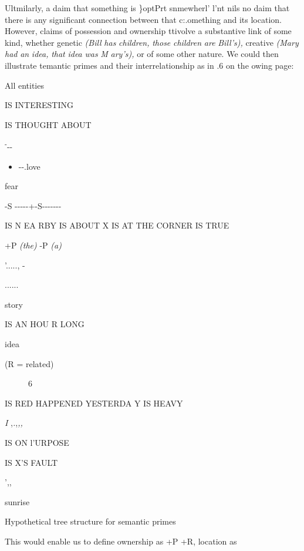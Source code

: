 Ultmilarly, a daim that something is \}optPrt snmewherl' l'nt nils no daim that there is any significant connection between that c:.ome\-thing and its location. However, claims of possession and ownership ttivolve a substantive link of some kind, whether genetic \textit{(Bill} \textit{has} \textit{children,} \textit{those} \textit{children} \textit{are} \textit{Bill's),} creative \textit{(Mary} \textit{had} \textit{an} \textit{idea,} \textit{that} \textit{idea} \textit{was} \textit{M} \textit{ary's),} or of some other nature. We could then illustrate temantic primes and their interrelationship as in .6 on the
owing page:



All entities 

IS INTERESTING

IS THOUGHT ABOUT

\textsuperscript{{}-}{}-{}- 

\begin{itemize}
\item {}-{}-.love
\end{itemize}

fear

{}-S {}-{}-{}-{}-{}-+{}-S{}-{}-{}-{}-{}-{}-{}-

IS N EA RBY IS ABOUT X IS AT THE CORNER IS TRUE 

+P \textit{(th}\textit{e}\textit{) }{}-P \textit{(}\textit{a}\textit{)} 

'....., -

......

story

IS AN HOU R LONG 

idea

(R = related)

\begin{figure}
\caption{6}
\label{fig:4}
\end{figure}

IS RED HAPPENED YESTERDA Y IS HEAVY

\textit{I },\textit{.},\textit{,,}

IS ON l'URPOSE

IS X'S FAULT

',,

sunrise

Hypothetical tree structure for semantic primes

This would enable us to define ownership as +P +R, location as

